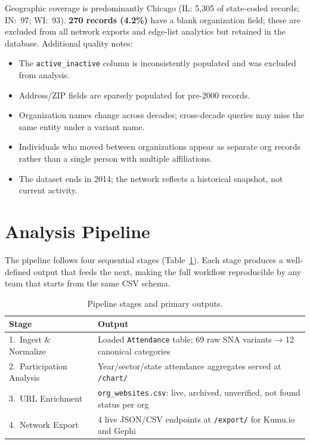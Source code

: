 \documentclass[10pt,twocolumn,letterpaper]{article}
\begin{document}
Geographic coverage is predominantly Chicago (IL: 5,305 of
state-coded records; IN:~97; WI:~93). \textbf{270 records (4.2\%)}
have a blank organization field; these are excluded from all network
exports and edge-list analytics but retained in the database.
Additional quality notes:
\begin{itemize}
  \item The \texttt{active\_inactive} column is inconsistently populated
        and was excluded from analysis.
  \item Address/ZIP fields are sparsely populated for pre-2000 records.
  \item Organization names change across decades; cross-decade queries
        may miss the same entity under a variant name.
  \item Individuals who moved between organizations appear as separate
        org records rather than a single person with multiple affiliations.
  \item The dataset ends in 2014; the network reflects a historical
        snapshot, not current activity.
\end{itemize}

\section{Analysis Pipeline}

The pipeline follows four sequential stages (Table~\ref{tab:pipeline}).
Each stage produces a well-defined output that feeds the next, making
the full workflow reproducible by any team that starts from the same
CSV schema.

\begin{table}[t]
\small
\caption{Pipeline stages and primary outputs.}
\label{tab:pipeline}
\begin{tabular}{lp{4.5cm}}
\toprule
Stage & Output \\
\midrule
1.\ Ingest \& Normalize & Loaded \texttt{Attendance} table; 69 raw SNA variants → 12 canonical categories \\
2.\ Participation Analysis & Year/sector/state attendance aggregates served at \texttt{/chart/} \\
3.\ URL Enrichment & \texttt{org\_websites.csv}: live, archived, unverified, not found status per org \\
4.\ Network Export & 4 live JSON/CSV endpoints at \texttt{/export/} for Kumu.io and Gephi \\
\bottomrule
\end{tabular}
\end{table}
\end{document}
